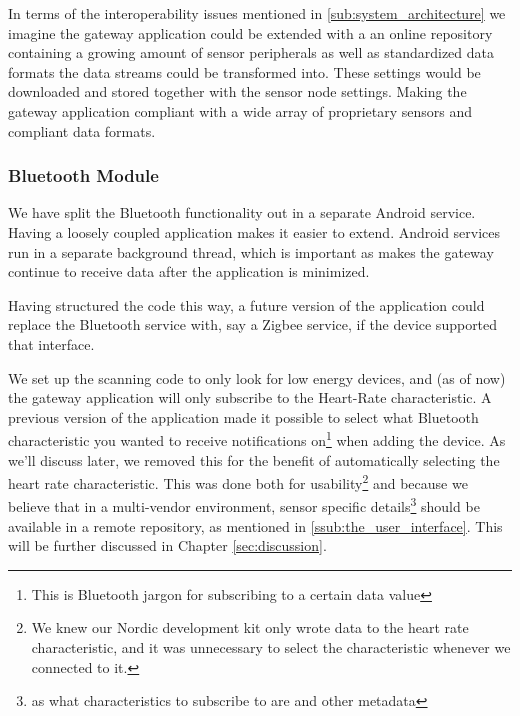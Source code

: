 In terms of the interoperability issues mentioned in \ref{sub:system_architecture} we imagine the gateway application could be extended with a an online repository containing a growing amount of sensor peripherals as well as standardized data formats the data streams could be transformed into. These settings would be downloaded and stored together with the sensor node settings. Making the gateway application compliant with a wide array of proprietary sensors and compliant data formats.


\subsubsection{Bluetooth Module} %
\label{ssub:bluetooth_module}


We have split the Bluetooth functionality out in a separate Android service. Having a loosely coupled application makes it easier to extend. Android services run in a separate background thread, which is important as makes the gateway continue to receive data after the application is minimized.

Having structured the code this way, a future version of the application could replace the Bluetooth service with, say a Zigbee service, if the device supported that interface.

We set up the scanning code to only look for low energy devices, and (as of now) the gateway application will only subscribe to the Heart-Rate characteristic. A previous version of the application made it possible to select what Bluetooth characteristic you wanted to receive notifications on\footnote{This is Bluetooth jargon for subscribing to a certain data value} when adding the device. As we'll discuss later, we removed this for the benefit of automatically selecting the heart rate characteristic. This was done both for usability\footnote{We knew our Nordic development kit only wrote data to the heart rate characteristic, and it was unnecessary to select the characteristic whenever we connected to it.} and because we believe that in a multi-vendor environment, sensor specific details\footnote{as what characteristics to subscribe to are and other metadata} should be available in a remote repository, as mentioned in \ref{ssub:the_user_interface}. This will be further discussed in Chapter \ref{sec:discussion}.


